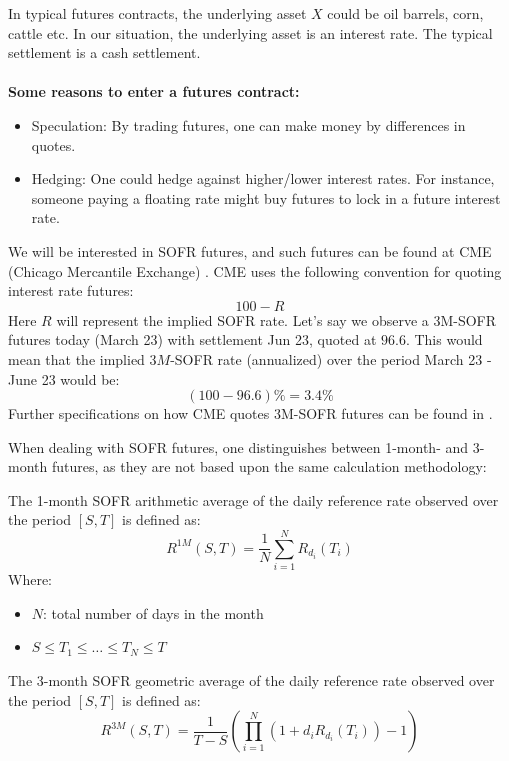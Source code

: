 In typical futures contracts, the underlying asset  
$X$ could be oil barrels, corn, cattle etc. In our situation, the underlying asset is an interest rate. The typical settlement is a cash settlement. 
\\~\\ 
\textbf{Some reasons to enter a futures contract:}
\begin{itemize}
    \item Speculation: By trading futures, one can make money by differences in quotes.  
    \item Hedging: One could hedge against higher/lower interest rates. For instance, someone paying a floating rate might buy futures to lock in a future interest rate. 
\end{itemize}



We will be interested in SOFR futures, and such futures can be found at CME (Chicago Mercantile Exchange) . CME uses the following convention for quoting interest rate futures: 
\[
100 - R
\]
Here $R$ will represent the implied SOFR rate. Let's say we observe a 3M-SOFR futures today (March 23) with settlement Jun 23, quoted at $96.6$. This would mean that the implied $3M$-SOFR rate (annualized) over the period March 23 - June 23 would be: 
\[
(100-96.6)\% = 3.4\% 
\] 
Further specifications on how CME quotes 3M-SOFR futures can be found in  \cite{cmegroup-sofr-futures}. 

\newpage 

When dealing with SOFR futures, one distinguishes between 1-month- and 3-month futures, as they are not based upon the same calculation methodology:

\begin{definition}
The 1-month 
SOFR arithmetic average of the daily reference rate observed over the period $[S,T]$ is defined as: 
\[
R^{1M}(S,T) = \frac{1}{N}\sum_{i=1}^{N}R_{d_{i}}(T_{i})
\]
Where:
\begin{itemize}[leftmargin=*]
    \item $N$: total number of days in the month
    \item $S\leq T_{1} \leq \dots \leq T_{N} \leq T$ 
\end{itemize}
\end{definition}



\begin{definition}
The 3-month 
SOFR geometric average of the daily reference rate observed over the period $[S,T]$ is defined as: 
\[
R^{3M}(S,T) = \frac{1}{T-S}\left(
\prod_{i=1}^{N}(1+d_{i}R_{d_{i}}(T_{i})) - 1
\right)
\]
\end{definition}



